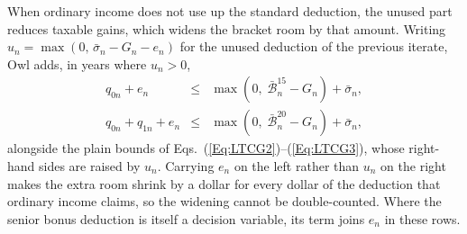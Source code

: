 \documentclass[fleqn,12pt]{report}
\begin{document}
	When ordinary income does not use up the standard deduction, the unused part reduces
	taxable gains, which widens the bracket room by that amount.  Writing
	$u_n = \max(0,\,\bar{\sigma}_n - G_n - e_n)$ for the unused deduction of the previous
	iterate, Owl adds, in years where $u_n > 0$,
	\begin{eqnarray}
		q_{0n} + e_n &\le& \max(0,\;\bar{\mathcal{B}}^{15}_n - G_n) + \bar{\sigma}_n, \label{Eq:LTCGded15} \\
		q_{0n} + q_{1n} + e_n &\le& \max(0,\;\bar{\mathcal{B}}^{20}_n - G_n) + \bar{\sigma}_n, \label{Eq:LTCGded20}
	\end{eqnarray}
	alongside the plain bounds of Eqs.~(\ref{Eq:LTCG2})--(\ref{Eq:LTCG3}), whose right-hand
	sides are raised by $u_n$.
	Carrying $e_n$ on the left rather than $u_n$ on the right makes the extra room shrink by a
	dollar for every dollar of the deduction that ordinary income claims, so the widening
	cannot be double-counted.
	Where the senior bonus deduction is itself a decision variable, its term joins $e_n$ in
	these rows.
\end{document}
